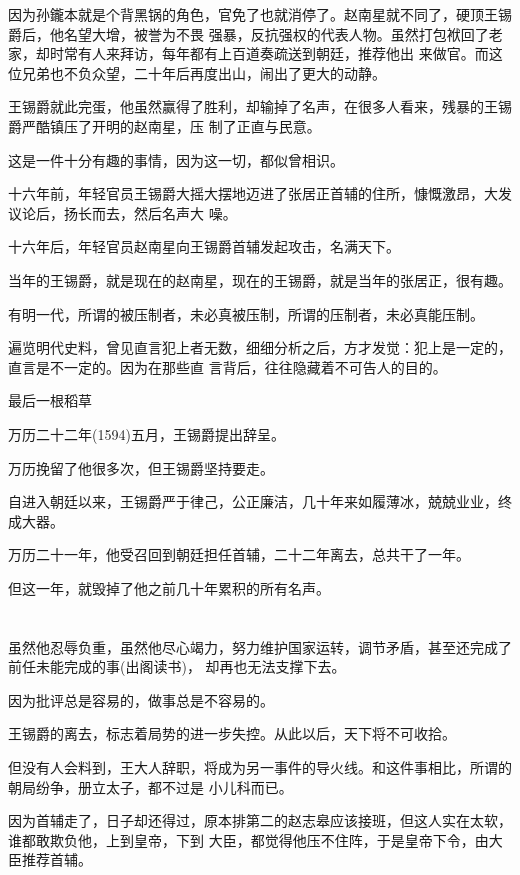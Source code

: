 \documentclass[11pt,a4paper,onecolumn]{article}
\begin{document}
因为孙鑨本就是个背黑锅的角色，官免了也就消停了。赵南星就不同了，硬顶王锡爵后，他名望大增，被誉为不畏
强暴，反抗强权的代表人物。虽然打包袱回了老家，却时常有人来拜访，每年都有上百道奏疏送到朝廷，推荐他出
来做官。而这位兄弟也不负众望，二十年后再度出山，闹出了更大的动静。

王锡爵就此完蛋，他虽然赢得了胜利，却输掉了名声，在很多人看来，残暴的王锡爵严酷镇压了开明的赵南星，压
制了正直与民意。

这是一件十分有趣的事情，因为这一切，都似曾相识。

十六年前，年轻官员王锡爵大摇大摆地迈进了张居正首辅的住所，慷慨激昂，大发议论后，扬长而去，然后名声大
噪。

十六年后，年轻官员赵南星向王锡爵首辅发起攻击，名满天下。

当年的王锡爵，就是现在的赵南星，现在的王锡爵，就是当年的张居正，很有趣。

有明一代，所谓的被压制者，未必真被压制，所谓的压制者，未必真能压制。

遍览明代史料，曾见直言犯上者无数，细细分析之后，方才发觉：犯上是一定的，直言是不一定的。因为在那些直
言背后，往往隐藏着不可告人的目的。

最后一根稻草

万历二十二年(1594)五月，王锡爵提出辞呈。

万历挽留了他很多次，但王锡爵坚持要走。

自进入朝廷以来，王锡爵严于律己，公正廉洁，几十年来如履薄冰，兢兢业业，终成大器。

万历二十一年，他受召回到朝廷担任首辅，二十二年离去，总共干了一年。

但这一年，就毁掉了他之前几十年累积的所有名声。

\section[\thesection]{}

虽然他忍辱负重，虽然他尽心竭力，努力维护国家运转，调节矛盾，甚至还完成了前任未能完成的事(出阁读书)，
却再也无法支撑下去。

因为批评总是容易的，做事总是不容易的。

王锡爵的离去，标志着局势的进一步失控。从此以后，天下将不可收拾。

但没有人会料到，王大人辞职，将成为另一事件的导火线。和这件事相比，所谓的朝局纷争，册立太子，都不过是
小儿科而已。

因为首辅走了，日子却还得过，原本排第二的赵志皋应该接班，但这人实在太软，谁都敢欺负他，上到皇帝，下到
大臣，都觉得他压不住阵，于是皇帝下令，由大臣推荐首辅。
\end{document}
